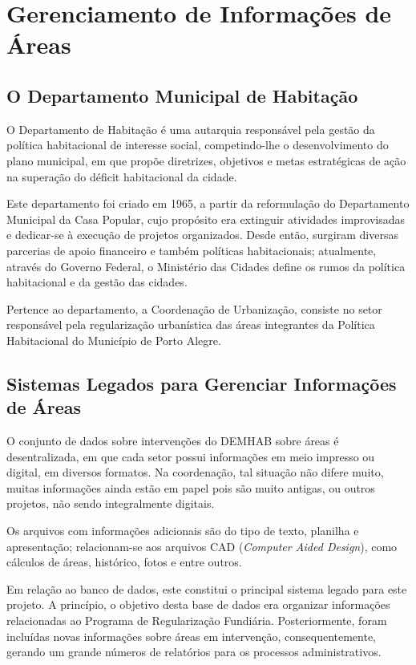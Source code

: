 \documentclass[10pt, twocolumn]{article}
\begin{document}
\section{Gerenciamento de Informações de Áreas}
\label{sect:gia}

\subsection{O Departamento Municipal de Habitação}
\label{sect:dmh}
O Departamento de Habitação é uma autarquia	responsável pela gestão da política habitacional de interesse social, competindo-lhe o desenvolvimento do plano municipal, em que propõe diretrizes, objetivos e metas estratégicas de ação na superação do déficit habitacional da cidade.

Este departamento foi criado em 1965, a partir da reformulação do Departamento Municipal da Casa Popular, cujo propósito era extinguir atividades improvisadas e dedicar-se à execução de projetos organizados. Desde então, surgiram diversas parcerias de apoio financeiro e também políticas habitacionais; atualmente, através do Governo Federal, o Ministério das Cidades define os rumos da política habitacional e da gestão das cidades.

Pertence ao departamento, a Coordenação de Urbanização, consiste no setor responsável pela regularização urbanística das áreas integrantes da Política Habitacional do Município de Porto Alegre.

\subsection{Sistemas Legados para Gerenciar Informações de Áreas}
\label{sect:slgia}
O conjunto de dados sobre intervenções do DEMHAB sobre áreas é desentralizada, em que cada setor possui informações em meio impresso ou digital, em diversos formatos.
Na coordenação, tal situação não difere muito, muitas informações ainda estão em papel pois são muito antigas, ou outros projetos, não sendo integralmente digitais.

Os arquivos com informações adicionais são do tipo de texto, planilha e apresentação; relacionam-se aos arquivos CAD (\textit{Computer Aided Design}), como cálculos de áreas, histórico, fotos e entre outros.

Em relação ao banco de dados, este constitui o principal sistema legado para este projeto. A princípio, o objetivo desta base de dados era organizar informações relacionadas ao Programa de Regularização Fundiária. Posteriormente, foram incluídas novas informações sobre áreas em intervenção, consequentemente, gerando um grande números de relatórios para os processos administrativos.
\end{document}
